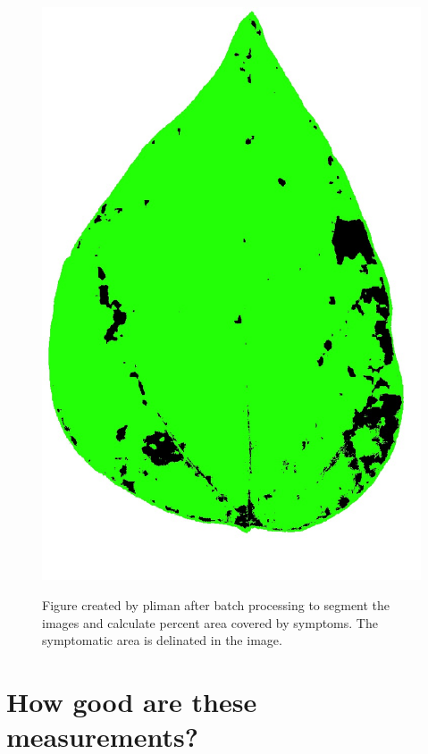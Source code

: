 \documentclass[
  letterpaper,
  DIV=11,
  numbers=noendperiod]{scrreprt}
\begin{document}
\begin{figure}

{\centering 

\href{fig_proc1}{\includegraphics[width=4.70833in,height=\textheight]{./imgs/processed/proc_img46.jpg}}

}

\caption{Figure created by pliman after batch processing to segment the
images and calculate percent area covered by symptoms. The symptomatic
area is delinated in the image.}

\end{figure}

\hypertarget{how-good-are-these-measurements}{%
\section{How good are these
measurements?}\label{how-good-are-these-measurements}}
\end{document}

